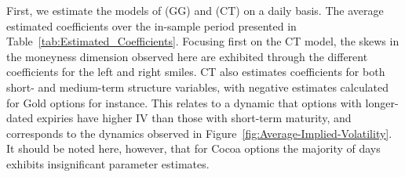 \documentclass[12pt,a4paper]{article}
\begin{document}
First, we estimate the models of \cite{goncalves2006predictable} (GG) and \cite{chalamandaris2011important} (CT) on a daily basis. The average estimated coefficients over the in-sample period presented in Table~\ref{tab:Estimated_Coefficients}. Focusing first on the CT model, the skews in the moneyness dimension observed here are exhibited through the different coefficients for the left and right smiles. CT also estimates coefficients for both short- and medium-term structure variables, with negative estimates calculated for Gold options for instance. This relates to a dynamic that options with longer-dated expiries have higher IV than those with short-term maturity, and corresponds to the dynamics observed in Figure~\ref{fig:Average-Implied-Volatility}. It should be noted here, however, that for Cocoa options the majority of days exhibits insignificant parameter estimates.
\end{document}
